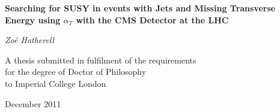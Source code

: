 \pagestyle{empty}

\begin{center}
\LARGE
{\bf  Searching for SUSY in events with Jets and Missing Transverse Energy using $\alpha_{T}$ with the CMS Detector at the LHC}

\vspace{1cm}

\large
{\it Zo\"e Hatherell}

\vspace{2cm}
\normalsize
A thesis submitted in fulfilment of the requirements\\
for the degree of Doctor of Philosophy\\
to Imperial College London

December 2011
\end{center}

